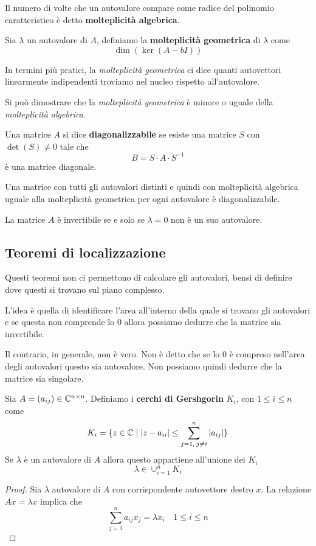 \begin{definition}
	Il numero di volte che un autovalore compare come radice del polinomio caratteristico è detto
	\textbf{molteplicità algebrica}.
\end{definition}

\begin{definition}
	Sia $\lambda$ un autovalore di $A$, definiamo la \textbf{molteplicità geometrica} di $\lambda$ come
	\[ \dim (\ker (A - b I)) \]
\end{definition}

In termini più pratici, la \emph{molteplicità geometrica} ci dice quanti autovettori linearmente indipendenti
troviamo nel nucleo rispetto all'autovalore.

Si può dimostrare che la \emph{molteplicità geometrica} è minore o uguale della \emph{molteplicità algebrica}.

\begin{definition}
	Una matrice $A$ si dice \textbf{diagonalizzabile} se esiste una matrice $S$ con $\det (S) \neq 0$ tale che
	\[ B = S \cdot A \cdot S^{-1} \]
	è una matrice diagonale.
\end{definition}

\begin{theorem}
	Una matrice con tutti gli autovalori distinti e quindi con molteplicità algebrica uguale alla molteplicità
	geometrica per ogni autovalore è diagonalizzabile.
\end{theorem}

\begin{theorem}
	La matrice $A$ è invertibile se e solo se $\lambda = 0$ non è un suo autovalore.
\end{theorem}

\subsection{Teoremi di localizzazione}
Questi teoremi non ci permettono di calcolare gli autovalori, bensì di definire dove questi si trovano sul piano
complesso.

L'idea è quella di identificare l'area all'interno della quale si trovano gli autovalori e se questa non comprende
lo 0 allora possiamo dedurre che la matrice sia invertibile.

Il contrario, in generale, non è vero. Non è detto che se lo 0 è compreso nell'area degli autovalori questo sia
autovalore. Non possiamo quindi dedurre che la matrice sia singolare.

\begin{theorem}[Gershgorin]
	Sia $A = (a_{ij}) \in \mathbb{C}^{n \times n}$. Definiamo i \textbf{cerchi di Gershgorin} $K_i$, con $1 \leq i \leq n$
	come
	\[ K_i = \{ z \in \mathbb{C} \mid |z - a_{ii}| \leq \sum_{j=1,\;j\neq i}^n |a_{ij}| \} \]
	Se $\lambda$ è un autovalore di $A$ allora questo appartiene all'unione dei $K_i$
	\[ \lambda \in \cup_{i=1}^n K_i \]
	\begin{proof}
		Sia $\lambda$ autovalore di $A$ con corrispondente autovettore destro $x$. La relazione $A x = \lambda x$
		implica che
		\[ \sum_{j=1}^n a_{ij} x_j = \lambda x_i \quad 1 \leq i \leq n \]
	\end{proof}
\end{theorem}
